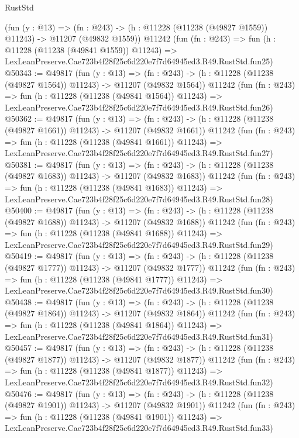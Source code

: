\begin{lexlean}{RustStd}
\begin{coremodule}
    (fun (y : @13) =>
    (fn : @243) -> (h : @11228 (@11238 (@49827 @1559)) @11243) -> @11207 (@49832 @1559))
    @11242
    (fun (fn : @243) =>
    fun (h : @11228 (@11238 (@49841 @1559)) @11243) =>
    LexLeanPreserve.Cae723b4f28f25c6d220e7f7d64945ed3.R49.RustStd.fun25)
@50343 := @49817
    (fun (y : @13) =>
    (fn : @243) -> (h : @11228 (@11238 (@49827 @1564)) @11243) -> @11207 (@49832 @1564))
    @11242
    (fun (fn : @243) =>
    fun (h : @11228 (@11238 (@49841 @1564)) @11243) =>
    LexLeanPreserve.Cae723b4f28f25c6d220e7f7d64945ed3.R49.RustStd.fun26)
@50362 := @49817
    (fun (y : @13) =>
    (fn : @243) -> (h : @11228 (@11238 (@49827 @1661)) @11243) -> @11207 (@49832 @1661))
    @11242
    (fun (fn : @243) =>
    fun (h : @11228 (@11238 (@49841 @1661)) @11243) =>
    LexLeanPreserve.Cae723b4f28f25c6d220e7f7d64945ed3.R49.RustStd.fun27)
@50381 := @49817
    (fun (y : @13) =>
    (fn : @243) -> (h : @11228 (@11238 (@49827 @1683)) @11243) -> @11207 (@49832 @1683))
    @11242
    (fun (fn : @243) =>
    fun (h : @11228 (@11238 (@49841 @1683)) @11243) =>
    LexLeanPreserve.Cae723b4f28f25c6d220e7f7d64945ed3.R49.RustStd.fun28)
@50400 := @49817
    (fun (y : @13) =>
    (fn : @243) -> (h : @11228 (@11238 (@49827 @1688)) @11243) -> @11207 (@49832 @1688))
    @11242
    (fun (fn : @243) =>
    fun (h : @11228 (@11238 (@49841 @1688)) @11243) =>
    LexLeanPreserve.Cae723b4f28f25c6d220e7f7d64945ed3.R49.RustStd.fun29)
@50419 := @49817
    (fun (y : @13) =>
    (fn : @243) -> (h : @11228 (@11238 (@49827 @1777)) @11243) -> @11207 (@49832 @1777))
    @11242
    (fun (fn : @243) =>
    fun (h : @11228 (@11238 (@49841 @1777)) @11243) =>
    LexLeanPreserve.Cae723b4f28f25c6d220e7f7d64945ed3.R49.RustStd.fun30)
@50438 := @49817
    (fun (y : @13) =>
    (fn : @243) -> (h : @11228 (@11238 (@49827 @1864)) @11243) -> @11207 (@49832 @1864))
    @11242
    (fun (fn : @243) =>
    fun (h : @11228 (@11238 (@49841 @1864)) @11243) =>
    LexLeanPreserve.Cae723b4f28f25c6d220e7f7d64945ed3.R49.RustStd.fun31)
@50457 := @49817
    (fun (y : @13) =>
    (fn : @243) -> (h : @11228 (@11238 (@49827 @1877)) @11243) -> @11207 (@49832 @1877))
    @11242
    (fun (fn : @243) =>
    fun (h : @11228 (@11238 (@49841 @1877)) @11243) =>
    LexLeanPreserve.Cae723b4f28f25c6d220e7f7d64945ed3.R49.RustStd.fun32)
@50476 := @49817
    (fun (y : @13) =>
    (fn : @243) -> (h : @11228 (@11238 (@49827 @1901)) @11243) -> @11207 (@49832 @1901))
    @11242
    (fun (fn : @243) =>
    fun (h : @11228 (@11238 (@49841 @1901)) @11243) =>
    LexLeanPreserve.Cae723b4f28f25c6d220e7f7d64945ed3.R49.RustStd.fun33)

\end{coremodule}
\end{lexlean}
